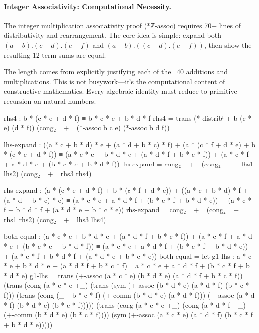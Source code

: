 \documentclass[11pt,a4paper]{book}
\def\cdot{.}%
\def\texttt#1{#1}%
\begin{document}
\paragraph{Integer Associativity: Computational Necessity.}
The integer multiplication associativity proof (\texttt{*ℤ-assoc}) requires 70+ lines 
of distributivity and rearrangement. The core idea is simple: expand both 
$(a - b) \cdot (c - d) \cdot (e - f)$ and $(a - b) \cdot ((c - d) \cdot (e - f))$, 
then show the resulting 12-term sums are equal.

The length comes from explicitly justifying each of the ~40 additions and multiplications. 
This is not busywork—it's the computational content of constructive mathematics. Every 
algebraic identity must reduce to primitive recursion on natural numbers.

\begin{code}        
        rhs4 : b * (c * e + d * f) ≡ b * c * e + b * d * f
        rhs4 = trans (*-distribˡ-+ b (c * e) (d * f)) (cong₂ _+_ (*-assoc b c e) (*-assoc b d f))
        
        lhs-expand : ((a * c + b * d) * e + (a * d + b * c) * f) + (a * (c * f + d * e) + b * (c * e + d * f))
                   ≡ (a * c * e + b * d * e + (a * d * f + b * c * f)) + (a * c * f + a * d * e + (b * c * e + b * d * f))
        lhs-expand = cong₂ _+_ (cong₂ _+_ lhs1 lhs2) (cong₂ _+_ rhs3 rhs4)
        
        rhs-expand : (a * (c * e + d * f) + b * (c * f + d * e)) + ((a * c + b * d) * f + (a * d + b * c) * e)
                   ≡ (a * c * e + a * d * f + (b * c * f + b * d * e)) + (a * c * f + b * d * f + (a * d * e + b * c * e))
        rhs-expand = cong₂ _+_ (cong₂ _+_ rhs1 rhs2) (cong₂ _+_ lhs3 lhs4)
        
        both-equal : (a * c * e + b * d * e + (a * d * f + b * c * f)) + (a * c * f + a * d * e + (b * c * e + b * d * f))
                   ≡ (a * c * e + a * d * f + (b * c * f + b * d * e)) + (a * c * f + b * d * f + (a * d * e + b * c * e))
        both-equal = 
          let 
            g1-lhs : a * c * e + b * d * e + (a * d * f + b * c * f)
                   ≡ a * c * e + a * d * f + (b * c * f + b * d * e)
            g1-lhs = trans (+-assoc (a * c * e) (b * d * e) (a * d * f + b * c * f))
                     (trans (cong (a * c * e +_) (trans (sym (+-assoc (b * d * e) (a * d * f) (b * c * f)))
                            (trans (cong (_+ b * c * f) (+-comm (b * d * e) (a * d * f)))
                            (+-assoc (a * d * f) (b * d * e) (b * c * f)))))
                     (trans (cong (a * c * e +_) (cong (a * d * f +_) (+-comm (b * d * e) (b * c * f))))
                     (sym (+-assoc (a * c * e) (a * d * f) (b * c * f + b * d * e)))))
            

\end{code}
\end{document}

